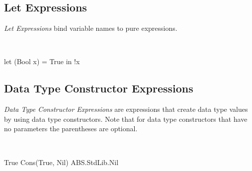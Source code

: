 \begin{abssyntax}
      {}
                {}
                {}
                {}
                {}
                {}
                {}
                {}
                {}
                {}
                \TRS{(}  \TRS{)}\\
     {}\\
  {}\ \ \\
      {}\\
  {}\ 
\end{abssyntax}


\subsection{Let Expressions}
\emph{Let Expressions} bind variable names to pure expressions.

\begin{abssyntax}
  {}\ \TRS{(}  \TRS{)}\ \TRS{=}\ \ \ 
\end{abssyntax}

\begin{absexample}
let (Bool x) = True in !x  
\end{absexample}

\subsection{Data Type Constructor Expressions}
\emph{Data Type Constructor Expressions} are expressions that create data type values by using data type constructors.
Note that for data type constructors that have no parameters the parentheses are optional.

\begin{abssyntax}
  {}
                    {}\ \TRS{(}  \TRS{)}
\end{abssyntax}

\begin{absexample}
True
Cons(True, Nil)  
ABS.StdLib.Nil
\end{absexample}

